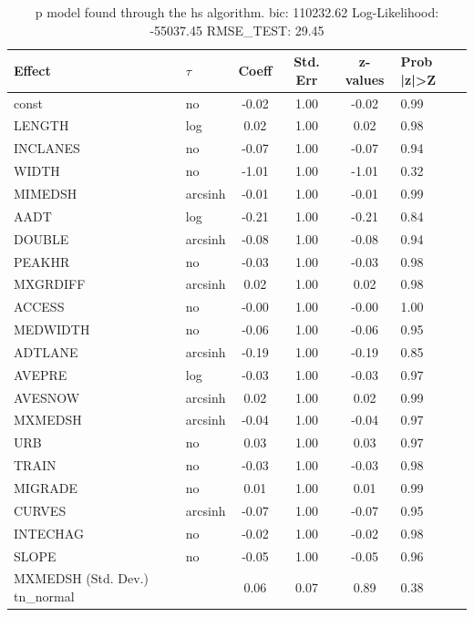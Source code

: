 \begin{table}
	\caption{p model found through the hs algorithm. bic: 110232.62 Log-Likelihood: -55037.45 RMSE_TEST: 29.45}
	\begin{center}
		\begin{tabular}{|l|l|c|c|c|l|}
			\hline
			Effect & $\tau$ & Coeff & Std. Err & z-values & Prob |z|>Z \\
			\hline
			const & no & -0.02 & 1.00 & -0.02 & 0.99 \\
			\hline
			LENGTH & log & 0.02 & 1.00 & 0.02 & 0.98 \\
			\hline
			INCLANES & no & -0.07 & 1.00 & -0.07 & 0.94 \\
			\hline
			WIDTH & no & -1.01 & 1.00 & -1.01 & 0.32 \\
			\hline
			MIMEDSH & arcsinh & -0.01 & 1.00 & -0.01 & 0.99 \\
			\hline
			AADT & log & -0.21 & 1.00 & -0.21 & 0.84 \\
			\hline
			DOUBLE & arcsinh & -0.08 & 1.00 & -0.08 & 0.94 \\
			\hline
			PEAKHR & no & -0.03 & 1.00 & -0.03 & 0.98 \\
			\hline
			MXGRDIFF & arcsinh & 0.02 & 1.00 & 0.02 & 0.98 \\
			\hline
			ACCESS & no & -0.00 & 1.00 & -0.00 & 1.00 \\
			\hline
			MEDWIDTH & no & -0.06 & 1.00 & -0.06 & 0.95 \\
			\hline
			ADTLANE & arcsinh & -0.19 & 1.00 & -0.19 & 0.85 \\
			\hline
			AVEPRE & log & -0.03 & 1.00 & -0.03 & 0.97 \\
			\hline
			AVESNOW & arcsinh & 0.02 & 1.00 & 0.02 & 0.99 \\
			\hline
			MXMEDSH & arcsinh & -0.04 & 1.00 & -0.04 & 0.97 \\
			\hline
			URB & no & 0.03 & 1.00 & 0.03 & 0.97 \\
			\hline
			TRAIN & no & -0.03 & 1.00 & -0.03 & 0.98 \\
			\hline
			MIGRADE & no & 0.01 & 1.00 & 0.01 & 0.99 \\
			\hline
			CURVES & arcsinh & -0.07 & 1.00 & -0.07 & 0.95 \\
			\hline
			INTECHAG & no & -0.02 & 1.00 & -0.02 & 0.98 \\
			\hline
			SLOPE & no & -0.05 & 1.00 & -0.05 & 0.96 \\
			\hline
			MXMEDSH (Std. Dev.) tn_normal &  & 0.06 & 0.07 & 0.89 & 0.38 \\

\end{tabular}
\end{center}
\end{table}
